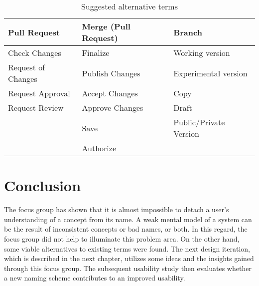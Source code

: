 \begin{table}[h!]
\begin{tabular}{|l|l|l|}
\hline
\rowcolor[HTML]{EFEFEF}
{\bf Pull Request} & {\bf Merge (Pull Request)} & {\bf Branch}           \\ \hline
Check Changes      & Finalize                   & Working version        \\
Request of Changes & Publish Changes            & Experimental version   \\
Request Approval   & Accept Changes             & Copy                   \\
Request Review     & Approve Changes            & Draft                  \\
                   & Save                       & Public/Private Version \\
                   & Authorize                  &                        \\ \hline
\end{tabular}
\centering
\caption{Suggested alternative terms}
\label{table:alt-terminology}
\end{table}

\section{Conclusion}
The focus group has shown that it is almost impossible to detach a user’s understanding of a concept from its name. A weak mental model of a system can be the result of inconsistent concepts or bad names, or both. In this regard, the focus group did not help to illuminate this problem area. On the other hand, some viable alternatives to existing terms were found. The next design iteration, which is described in the next chapter, utilizes some ideas and the insights gained through this focus group. The subsequent usability study then evaluates whether a new naming scheme contributes to an improved usability.
